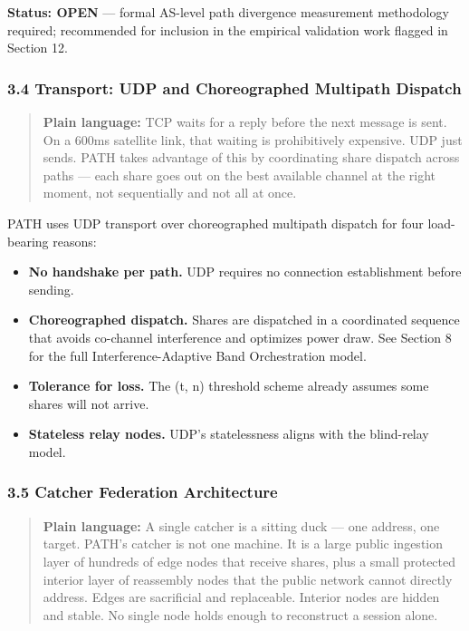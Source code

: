\documentclass[
  11pt,
]{article}
\providecommand{\tightlist}{%
  \setlength{\itemsep}{0pt}\setlength{\parskip}{0pt}}
\begin{document}
\textbf{Status: OPEN} --- formal AS-level path divergence measurement
methodology required; recommended for inclusion in the empirical
validation work flagged in Section 12.

\hypertarget{transport-udp-and-choreographed-multipath-dispatch}{%
\subsubsection{3.4 Transport: UDP and Choreographed Multipath
Dispatch}\label{transport-udp-and-choreographed-multipath-dispatch}}

\begin{quote}
\textbf{Plain language:} TCP waits for a reply before the next message
is sent. On a 600ms satellite link, that waiting is prohibitively
expensive. UDP just sends. PATH takes advantage of this by coordinating
share dispatch across paths --- each share goes out on the best
available channel at the right moment, not sequentially and not all at
once.
\end{quote}

PATH uses UDP transport over choreographed multipath dispatch for four
load-bearing reasons:

\begin{itemize}
\tightlist
\item
  \textbf{No handshake per path.} UDP requires no connection
  establishment before sending.
\item
  \textbf{Choreographed dispatch.} Shares are dispatched in a
  coordinated sequence that avoids co-channel interference and optimizes
  power draw. See Section 8 for the full Interference-Adaptive Band
  Orchestration model.
\item
  \textbf{Tolerance for loss.} The (t, n) threshold scheme already
  assumes some shares will not arrive.
\item
  \textbf{Stateless relay nodes.} UDP's statelessness aligns with the
  blind-relay model.
\end{itemize}

\hypertarget{catcher-federation-architecture}{%
\subsubsection{3.5 Catcher Federation
Architecture}\label{catcher-federation-architecture}}

\begin{quote}
\textbf{Plain language:} A single catcher is a sitting duck --- one
address, one target. PATH's catcher is not one machine. It is a large
public ingestion layer of hundreds of edge nodes that receive shares,
plus a small protected interior layer of reassembly nodes that the
public network cannot directly address. Edges are sacrificial and
replaceable. Interior nodes are hidden and stable. No single node holds
enough to reconstruct a session alone.
\end{quote}
\end{document}

